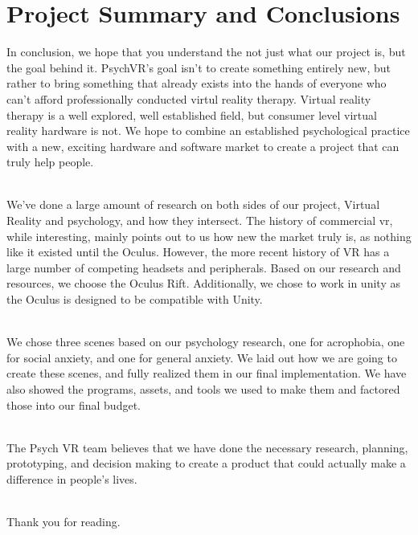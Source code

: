 \documentclass[a4paper,10pt]{article}
\begin{document}
\pagebreak
\section{Project Summary and Conclusions}
In conclusion, we hope that you understand the not just what our project is, but the goal behind it.  PsychVR's goal isn't to create something entirely new, but rather to bring something that already exists into the hands of everyone who can't afford professionally conducted virtul reality therapy.  Virtual reality therapy is a well explored, well established field, but consumer level virtual reality hardware is not.  We hope to combine an established psychological practice with a new, exciting hardware and software market to create a project that can truly help people. 
\par ~\\
We've done a large amount of research on both sides of our project, Virtual Reality and psychology, and how they intersect.  The history of commercial vr, while interesting, mainly points out to us how new the market truly is, as nothing like it existed until the Oculus.  However, the more recent history of VR has a large number of competing headsets and peripherals.  Based on our research and resources, we choose the Oculus Rift.  Additionally, we chose to work in unity as the Oculus is designed to be compatible with Unity.  
\par ~\\
We chose three scenes based on our psychology research, one for acrophobia, one for social anxiety, and one for general anxiety.  We laid out how we are going to create these scenes, and fully realized them in our final implementation. We have also showed the programs, assets, and tools we used to make them and factored those into our final budget.
\par ~\\
The Psych VR team believes that we have done the necessary research, planning, prototyping, and decision making to create a product that could actually make a difference in people's lives.
\par ~\\
Thank you for reading.
\pagebreak

\setcounter{page}{0}
\end{document}
